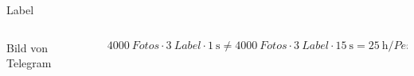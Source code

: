 \begin{frame}[t]{Label}
  \begin{columns}
    \begin{column}{0.3\textwidth}
      Bild von Telegram
    \end{column}
    \begin{column}{0.7\textwidth}
      $\SI{4000}{Fotos} \cdot \SI{3}{Label} \cdot \SI{1}{\second} \neq \SI{4000}{Fotos}
      \cdot \SI{3}{Label} \cdot \SI{15}{\second} = \SI{25}{\hour\per Person}  $
    \end{column}
  \end{columns}
\end{frame}
